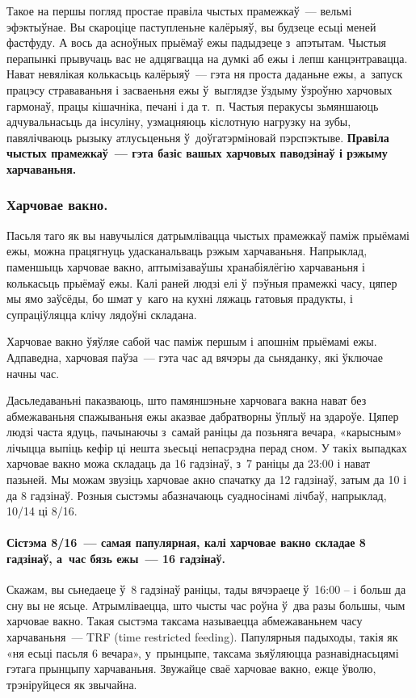 Такое на першы погляд простае правіла чыстых прамежкаў~--- вельмі эфэктыўнае. Вы скароціце паступленьне калёрыяў, вы будзеце есьці меней фастфуду. А вось да асноўных прыёмаў ежы падыдзеце з~апэтытам. Чыстыя перапынкі прывучаць вас не адцягвацца на думкі аб ежы і лепш канцэнтравацца. Нават невялікая колькасьць калёрыяў~--- гэта ня проста даданьне ежы, а~запуск працэсу страваваньня і засваеньня ежы ў~выглядзе ўздыму ўзроўню харчовых гармонаў, працы кішачніка, печані і да т.~п. Частыя перакусы зьмяншаюць адчувальнасьць да інсуліну, узмацняюць кіслотную нагрузку на зубы, павялічваюць рызыку атлусьценьня ў~доўгатэрміновай пэрспэктыве. \textbf{Правіла чыстых прамежкаў~--- гэта базіс вашых харчовых паводзінаў і рэжыму харчаваньня.}

\subsubsection{Харчовае вакно.}
Пасьля таго як вы навучыліся датрымлівацца чыстых прамежкаў паміж прыёмамі ежы, можна працягнуць удасканальваць рэжым харчаваньня. Напрыклад, паменшыць харчовае вакно, аптымізаваўшы хранабіялёгію харчаваньня і колькасьць прыёмаў ежы. Калі раней людзі елі ў~пэўныя прамежкі часу, цяпер мы ямо заўсёды, бо шмат у~каго на кухні ляжаць гатовыя прадукты, і супраціўляцца клічу лядоўні складана. 


Харчовае вакно ўяўляе сабой час паміж першым і апошнім прыёмамі ежы. Адпаведна, харчовая паўза~--- гэта час ад вячэры да сьняданку, які ўключае начны час. 

Дасьледаваньні паказваюць, што памяншэньне харчовага вакна нават без абмежаваньня спажываньня ежы аказвае дабратворны ўплыў на здароўе. Цяпер людзі часта ядуць, пачынаючы з~самай раніцы да позьняга вечара, «карысным» лічыцца выпіць кефір ці нешта зьесьці непасрэдна перад сном. У такіх выпадках харчовае вакно можа складаць да 16 гадзінаў, з~7 раніцы да 23:00 і нават пазьней. Мы можам звузіць харчовае акно спачатку да 12 гадзінаў, затым да 10 і да 8 гадзінаў. Розныя сыстэмы абазначаюць суадносінамі лічбаў, напрыклад, 10/14 ці 8/16.

\paragraph{Сістэма 8/16~--- самая папулярная, калі харчовае вакно складае 8 гадзінаў, а~час бязь ежы~--- 16 гадзінаў.} Скажам, вы сьнедаеце ў~8 гадзінаў раніцы, тады вячэраеце ў~16:00 -- і больш да сну вы не ясьце. Атрымліваецца, што чысты час роўна ў~два разы большы, чым харчовае вакно. Такая сыстэма таксама называецца абмежаваньнем часу харчаваньня~--- TRF (time restricted feeding). Папулярныя падыходы, такія як «ня есьці пасьля 6 вечара», у~прынцыпе, таксама зьяўляюцца разнавіднасьцямі гэтага прынцыпу харчаваньня. Звужайце сваё харчовае вакно, ежце ўволю, трэніруйцеся як звычайна.

